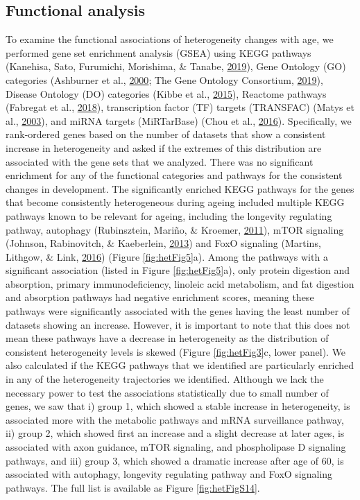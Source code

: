 \documentclass[12pt,twoside]{unicam}
\begin{document}
\hypertarget{functional-analysis}{%
\subsection{Functional analysis}\label{functional-analysis}}

To examine the functional associations of heterogeneity changes with age, we performed gene set enrichment analysis (GSEA) using KEGG pathways (Kanehisa, Sato, Furumichi, Morishima, \& Tanabe, \protect\hyperlink{ref-Kanehisa2019}{2019}), Gene Ontology (GO) categories (Ashburner et al., \protect\hyperlink{ref-Ashburner2000}{2000}; The Gene Ontology Consortium, \protect\hyperlink{ref-TheGeneOntologyConsortium2019}{2019}), Disease Ontology (DO) categories (Kibbe et al., \protect\hyperlink{ref-Kibbe2015}{2015}), Reactome pathways (Fabregat et al., \protect\hyperlink{ref-Fabregat2018}{2018}), transcription factor (TF) targets (TRANSFAC) (Matys et al., \protect\hyperlink{ref-Matys2003}{2003}), and miRNA targets (MiRTarBase) (Chou et al., \protect\hyperlink{ref-Chou2016}{2016}). Specifically, we rank-ordered genes based on the number of datasets that show a consistent increase in heterogeneity and asked if the extremes of this distribution are associated with the gene sets that we analyzed. There was no significant enrichment for any of the functional categories and pathways for the consistent changes in development. The significantly enriched KEGG pathways for the genes that become consistently heterogeneous during ageing included multiple KEGG pathways known to be relevant for ageing, including the longevity regulating pathway, autophagy (Rubinsztein, Mariño, \& Kroemer, \protect\hyperlink{ref-Rubinsztein2011}{2011}), mTOR signaling (Johnson, Rabinovitch, \& Kaeberlein, \protect\hyperlink{ref-Johnson2013}{2013}) and FoxO signaling (Martins, Lithgow, \& Link, \protect\hyperlink{ref-Martins2016}{2016}) (Figure \ref{fig:hetFig5}a). Among the pathways with a significant association (listed in Figure \ref{fig:hetFig5}a), only protein digestion and absorption, primary immunodeficiency, linoleic acid metabolism, and fat digestion and absorption pathways had negative enrichment scores, meaning these pathways were significantly associated with the genes having the least number of datasets showing an increase. However, it is important to note that this does not mean these pathways have a decrease in heterogeneity as the distribution of consistent heterogeneity levels is skewed (Figure \ref{fig:hetFig3}c, lower panel). We also calculated if the KEGG pathways that we identified are particularly enriched in any of the heterogeneity trajectories we identified. Although we lack the necessary power to test the associations statistically due to small number of genes, we saw that i) group 1, which showed a stable increase in heterogeneity, is associated more with the metabolic pathways and mRNA surveillance pathway, ii) group 2, which showed first an increase and a slight decrease at later ages, is associated with axon guidance, mTOR signaling, and phospholipase D signaling pathways, and iii) group 3, which showed a dramatic increase after age of 60, is associated with autophagy, longevity regulating pathway and FoxO signaling pathways. The full list is available as Figure \ref{fig:hetFigS14}.
\end{document}
